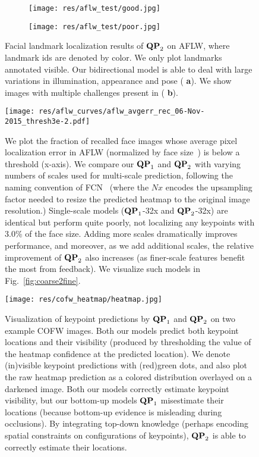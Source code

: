 \documentclass[10pt,twocolumn,letterpaper]{article}
\newcommand{\QP}[1]{{${\bf QP}_{#1}$}}
\begin{document}
\begin{figure}[t!]
  \centering
  \begin{subfigure}{.75\linewidth}
    \texttt{[image: res/aflw\_test/good.jpg]}
    \caption{}
  \end{subfigure}
  \begin{subfigure}{.195\linewidth}
    \texttt{[image: res/aflw\_test/poor.jpg]}
    \caption{}
  \end{subfigure}
  \caption{Facial landmark localization results of \QP{2} on AFLW,
    where landmark ids are denoted by color. We only plot landmarks
    annotated visible. Our bidirectional model is able to deal with
    large variations in illumination, appearance and pose ({\bf
      a}). We show images with multiple challenges present in ({\bf
      b}).}
  \label{fig:aflw}
\end{figure}





\begin{figure}[t!]
  \centering
\texttt{[image: res/aflw\_curves/aflw\_avgerr\_rec\_06-Nov-2015\_thresh3e-2.pdf]}
\caption{We plot the fraction of recalled face images whose average
    pixel localization error in AFLW (normalized by face
    size~\cite{zhu2012face}) is below a threshold (x-axis). We compare
    our \QP{1} and \QP{2} with varying numbers of scales used for
    multi-scale prediction, following the naming convention of
    FCN~\cite{long2014fully} (where the $Nx$ encodes the upsampling
    factor needed to resize the predicted heatmap to the original
    image resolution.) Single-scale models (\QP{1}-32x and \QP{2}-32x)
    are identical but perform quite poorly, not localizing any
    keypoints with 3.0\% of the face size. Adding more scales
    dramatically improves performance, and moreover, as we add
    additional scales, the relative improvement of \QP{2} also
    increases (as finer-scale features benefit the most from
    feedback). We visualize such models in Fig.~\ref{fig:coarse2fine}.}
  \label{fig:aflw-curve}
\end{figure}

\begin{figure}[t!]
  \centering
  \texttt{[image: res/cofw\_heatmap/heatmap.jpg]}
  \caption{Visualization of keypoint predictions by \QP{1} and
    \QP{2} on two example COFW images. Both our models predict both
    keypoint locations and their visibility (produced by thresholding
    the value of the heatmap confidence at the predicted location). We
    denote (in)visible keypoint predictions with (red)green dots, and
    also plot the raw heatmap prediction as a colored distribution
    overlayed on a darkened image. Both our models correctly estimate
    keypoint visibility, but our bottom-up models \QP{1} misestimate
    their locations (because bottom-up evidence is misleading during
    occlusions). By integrating top-down knowledge (perhaps encoding
    spatial constraints on configurations of keypoints), \QP{2} is
    able to correctly estimate their locations.}
  \label{fig:cofw-heatmap}
\end{figure}
\end{document}
